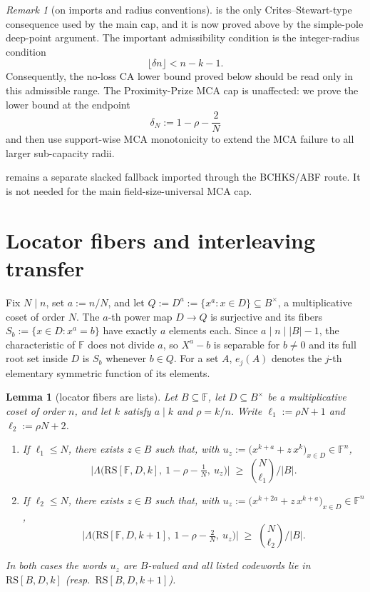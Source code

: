 \documentclass[11pt]{article}
\newtheorem{lemma}[theorem]{Lemma}
\theoremstyle{definition}
\theoremstyle{remark}
\newtheorem{remark}[theorem]{Remark}
\newcommand{\F}{\mathbb{F}}
\newcommand{\B}{B}
\newcommand{\RS}{\mathrm{RS}}
\newcommand{\Lst}{\Lambda}
\begin{document}
\begin{remark}[on imports and radius conventions]\label{rem:import}
 is the only Crites--Stewart-type consequence used by the main cap, and it is now proved above by the simple-pole deep-point argument.  The important admissibility condition is the integer-radius condition
\[
        \lfloor \delta n\rfloor < n-k-1 .
\]
Consequently, the no-loss CA lower bound proved below should be read only in this admissible range. The Proximity-Prize MCA cap is unaffected: we prove the lower bound at the endpoint
\[
        \delta_N:=1-\rho-\frac2N
\]
and then use support-wise MCA monotonicity to extend the MCA failure to all larger sub-capacity radii.

 remains a separate slacked fallback imported through the BCHKS/ABF route. It is not needed for the main field-size-universal MCA cap.
\end{remark}

\section{Locator fibers and interleaving transfer}\label{sec:fiber}

Fix $N\mid n$, set $a:=n/N$, and let $Q:=D^{a}:=\{x^a:x\in D\}\subseteq\B^\times$, a multiplicative coset of order $N$. The $a$-th power map $D\to Q$ is surjective and its fibers $S_b:=\{x\in D:x^a=b\}$ have exactly $a$ elements each. Since $a\mid n\mid|\B|-1$, the characteristic of $\F$ does not divide $a$, so $X^a-b$ is separable for $b\ne0$ and its full root set inside $D$ is $S_b$ whenever $b\in Q$. For a set $A$, $e_j(A)$ denotes the $j$-th elementary symmetric function of its elements.

\begin{lemma}[locator fibers are lists]\label{lem:fiber}
Let $\B\subseteq\F$, let $D\subseteq\B^\times$ be a multiplicative coset of order $n$, and let $k$ satisfy $a\mid k$ and $\rho=k/n$. Write $\ell_1:=\rho N+1$ and $\ell_2:=\rho N+2$.
\begin{enumerate}[label=\textup{(\roman*)}]
\item If $\ell_1\le N$, there exists $z\in\B$ such that, with $u_z:=\bigl(x^{k+a}+z\,x^{k}\bigr)_{x\in D}\in\F^n$,
\[
\bigl|\Lst\bigl(\RS[\F,D,k],\ 1-\rho-\tfrac1N,\ u_z\bigr)\bigr|\;\ge\;\binom{N}{\ell_1}\Big/|\B| .
\]
\item If $\ell_2\le N$, there exists $z\in\B$ such that, with $u_z:=\bigl(x^{k+2a}+z\,x^{k+a}\bigr)_{x\in D}\in\F^n$,
\[
\bigl|\Lst\bigl(\RS[\F,D,k+1],\ 1-\rho-\tfrac2N,\ u_z\bigr)\bigr|\;\ge\;\binom{N}{\ell_2}\Big/|\B| .
\]
\end{enumerate}
In both cases the words $u_z$ are $\B$-valued and all listed codewords lie in $\RS[\B,D,k]$ \textup(resp.\ $\RS[\B,D,k+1]$\textup).
\end{lemma}
\end{document}
